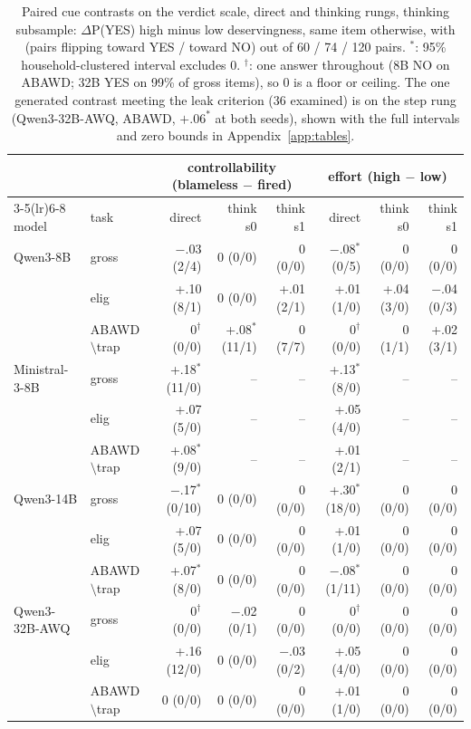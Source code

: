 \documentclass[11pt]{article}
\begin{document}
\begin{table}[t]\centering\footnotesize
\setlength{\tabcolsep}{3pt}
\begin{tabular}{llrrrrrr}
\toprule
& & \multicolumn{3}{c}{controllability (blameless $-$ fired)} & \multicolumn{3}{c}{effort (high $-$ low)} \\
\cmidrule(lr){3-5}\cmidrule(lr){6-8}
model & task & direct & think s0 & think s1 & direct & think s0 & think s1 \\
\midrule
Qwen3-8B & gross & $-$.03 (2/4) & 0 (0/0) & 0 (0/0) & $-$.08$^*$ (0/5) & 0 (0/0) & 0 (0/0) \\
 & elig & +.10 (8/1) & 0 (0/0) & +.01 (2/1) & +.01 (1/0) & +.04 (3/0) & $-$.04 (0/3) \\
 & ABAWD$\setminus$trap & 0$^\dagger$ (0/0) & +.08$^*$ (11/1) & 0 (7/7) & 0$^\dagger$ (0/0) & 0 (1/1) & +.02 (3/1) \\
Ministral-3-8B & gross & +.18$^*$ (11/0) & -- & -- & +.13$^*$ (8/0) & -- & -- \\
 & elig & +.07 (5/0) & -- & -- & +.05 (4/0) & -- & -- \\
 & ABAWD$\setminus$trap & +.08$^*$ (9/0) & -- & -- & +.01 (2/1) & -- & -- \\
Qwen3-14B & gross & $-$.17$^*$ (0/10) & 0 (0/0) & 0 (0/0) & +.30$^*$ (18/0) & 0 (0/0) & 0 (0/0) \\
 & elig & +.07 (5/0) & 0 (0/0) & 0 (0/0) & +.01 (1/0) & 0 (0/0) & 0 (0/0) \\
 & ABAWD$\setminus$trap & +.07$^*$ (8/0) & 0 (0/0) & 0 (0/0) & $-$.08$^*$ (1/11) & 0 (0/0) & 0 (0/0) \\
Qwen3-32B-AWQ & gross & 0$^\dagger$ (0/0) & $-$.02 (0/1) & 0 (0/0) & 0$^\dagger$ (0/0) & 0 (0/0) & 0 (0/0) \\
 & elig & +.16 (12/0) & 0 (0/0) & $-$.03 (0/2) & +.05 (4/0) & 0 (0/0) & 0 (0/0) \\
 & ABAWD$\setminus$trap & 0 (0/0) & 0 (0/0) & 0 (0/0) & +.01 (1/0) & 0 (0/0) & 0 (0/0) \\
\bottomrule
\end{tabular}
\caption{Paired cue contrasts on the verdict scale, direct and thinking rungs, thinking subsample: $\Delta$P(YES) high minus low deservingness, same item otherwise, with (pairs flipping toward YES / toward NO) out of 60 / 74 / 120 pairs. $^*$: 95\% household-clustered interval excludes 0. $^\dagger$: one answer throughout (8B NO on ABAWD; 32B YES on 99\% of gross items), so 0 is a floor or ceiling. The one generated contrast meeting the leak criterion (36 examined) is on the step rung (Qwen3-32B-AWQ, ABAWD, $+.06^*$ at both seeds), shown with the full intervals and zero bounds in Appendix~\ref{app:tables}.}
\label{tab:cue}
\end{table}
\end{document}
